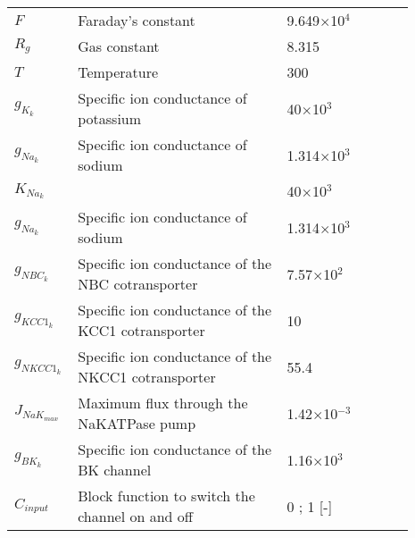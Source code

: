 \documentclass[fleqn]{report}
\numberwithin{equation}{section}
\numberwithin{equation}{section}
\begin{document}

%
%
%
\begin{table}[h!]
\centering
\begin{tabular}{ p{0.09\linewidth}  >{\footnotesize} p{0.5\linewidth}  >{\footnotesize} p{0.27\linewidth} >{\footnotesize} p{0.03\linewidth} }
\hline	
$F$ 			& Faraday's constant														& 9.649$\times$10$^4$ \Cmol 	& \\
$R_g$ 			& Gas constant 															& 8.315 \JmolK		& \\
$T$ 	    	& Temperature 															& 300 \Kelvin		& \\
$g_{K_{k}}$ 	& Specific ion conductance of potassium 								& 40$\times$10$^3$ \perOhmm 		& \cite{Ostby2009}  \\
$g_{Na_k}$ 		& Specific ion conductance of sodium 									& 1.314$\times$10$^3$  \perOhmm 	& \cite{Ostby2009}  \\
$K_{Na_k}$ 	& 								& 40$\times$10$^3$ \perOhmm 		& \cite{Ostby2009}  \\
$g_{Na_k}$ 		& Specific ion conductance of sodium 									& 1.314$\times$10$^3$  \perOhmm 	& \cite{Ostby2009}  \\
$g_{NBC_k}$ 	& Specific ion conductance of the NBC cotransporter						& 7.57$\times$10$^2$ \perOhmm 	& \cite{Ostby2009}  \\
$g_{KCC1_k}$ 	& Specific ion conductance of the KCC1 cotransporter					& 10 \perOhmm 	& \cite{Ostby2009}  \\
$g_{NKCC1_k}$ 	& Specific ion conductance of the NKCC1 cotransporter	 				& 55.4 \perOhmm 	& \cite{Ostby2009}  \\
$J_{NaK_{max}}$ & Maximum flux through the NaKATPase pump							& 1.42$\times$10$^{-3}$ \uMms 	& \cite{Ostby2009}  \\
$g_{BK_k}$ 		& Specific ion conductance of the BK channel							& 1.16$\times$10$^3$   \perOhmm & \cite{GonzalezFernandez1994}  \\
$C_{input}$  & Block function to switch the channel on and off &  0 ; 1 [-] 			&  \\
\hline
\end{tabular}
\end{table}
\end{document}

